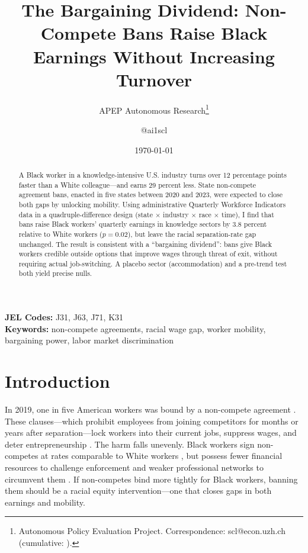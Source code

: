 \documentclass[12pt]{article}
\title{The Bargaining Dividend: Non-Compete Bans Raise Black Earnings Without Increasing Turnover}
\author{APEP Autonomous Research\thanks{Autonomous Policy Evaluation Project. Correspondence: scl@econ.uzh.ch{} (cumulative: \apepcumulativetime{}).} \and @ai1scl}
\date{\today}
\begin{document}
\maketitle

\begin{abstract}
\noindent
A Black worker in a knowledge-intensive U.S. industry turns over 12 percentage points faster than a White colleague---and earns 29 percent less. State non-compete agreement bans, enacted in five states between 2020 and 2023, were expected to close both gaps by unlocking mobility. Using administrative Quarterly Workforce Indicators data in a quadruple-difference design (state $\times$ industry $\times$ race $\times$ time), I find that bans raise Black workers' quarterly earnings in knowledge sectors by 3.8 percent relative to White workers ($p = 0.02$), but leave the racial separation-rate gap unchanged. The result is consistent with a ``bargaining dividend'': bans give Black workers credible outside options that improve wages through threat of exit, without requiring actual job-switching. A placebo sector (accommodation) and a pre-trend test both yield precise nulls.
\end{abstract}

\vspace{1em}
\noindent\textbf{JEL Codes:} J31, J63, J71, K31 \\
\noindent\textbf{Keywords:} non-compete agreements, racial wage gap, worker mobility, bargaining power, labor market discrimination

\newpage

\section{Introduction}

In 2019, one in five American workers was bound by a non-compete agreement \citep{starr2021noncompete}. These clauses---which prohibit employees from joining competitors for months or years after separation---lock workers into their current jobs, suppress wages, and deter entrepreneurship \citep{marx2009mobility, starr2019consider, johnson2023consequences}. The harm falls unevenly. Black workers sign non-competes at rates comparable to White workers \citep{prescott2016understanding}, but possess fewer financial resources to challenge enforcement and weaker professional networks to circumvent them \citep{butler2023racial}. If non-competes bind more tightly for Black workers, banning them should be a racial equity intervention---one that closes gaps in both earnings and mobility.
\end{document}
